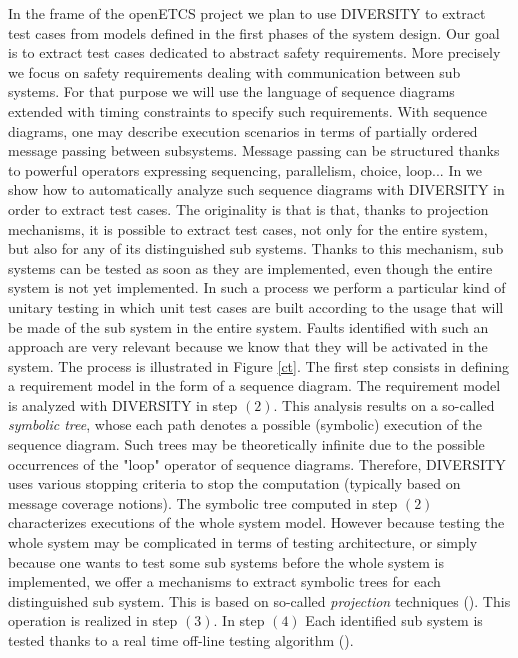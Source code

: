 \documentclass{template/openetcs_report}
\begin{document}
In the frame of the openETCS project we plan to use DIVERSITY to extract test cases from models defined in the first phases of the system design. Our goal is to extract test cases dedicated to abstract safety requirements. More precisely we focus on safety requirements  dealing with communication between sub systems. For that purpose we will use the language of sequence diagrams extended with timing constraints to specify such requirements. With sequence diagrams, one may describe execution scenarios in terms of partially ordered message passing between subsystems. Message passing can be structured thanks to powerful operators expressing sequencing, parallelism, choice, loop...   
In \cite{BGS11} we show how to automatically analyze such sequence diagrams with DIVERSITY in order to extract test cases. The originality is that is that, thanks to projection mechanisms, it is possible to extract test cases, not only for the entire system, but also for any of its distinguished sub systems. Thanks to this mechanism, sub systems can be tested as soon as they are implemented, even though the entire system is not yet implemented. In such a process we perform a particular kind of unitary testing in which unit test cases are built according to the usage that will be made of the sub system in the entire system. 
Faults identified with such an approach are very relevant because we know that they will be activated in the system. The process is illustrated in Figure \ref{ct}.
The first step consists in defining a requirement model in the form of a sequence diagram. The requirement model is analyzed with DIVERSITY in step $(2)$. This analysis results on a so-called {\em symbolic tree}, whose each path denotes a possible (symbolic) execution of the sequence diagram. 
Such trees may be theoretically infinite due to the possible occurrences of the "loop" operator of sequence diagrams. Therefore, DIVERSITY uses various stopping criteria to stop the computation (typically based on message coverage notions). 
The symbolic tree computed in step $(2)$ characterizes executions of the whole system model. However because testing the whole system may be complicated in terms of testing architecture, or simply because one wants to test some sub systems before the whole system is implemented, we offer a mechanisms to extract symbolic trees for each distinguished sub system. This is based on so-called {\em projection} techniques (\cite{FGG07,EGL11}). This operation is realized in step $(3)$. In step $(4)$ Each identified sub system is tested thanks to a real time off-line testing algorithm (\cite{BEGL12}).
\end{document}
